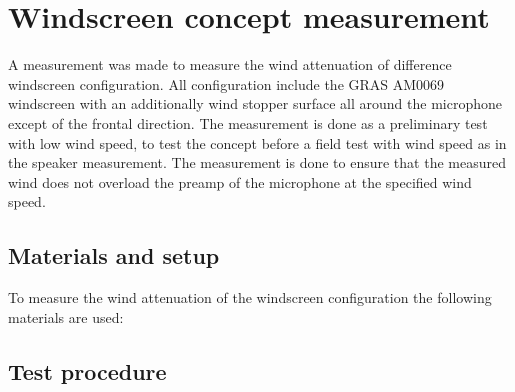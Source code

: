 \chapter{Windscreen concept measurement}
A measurement was made to measure the wind attenuation of difference windscreen configuration. All configuration include the GRAS AM0069 windscreen with an additionally wind stopper surface all around the microphone except of the frontal direction. The measurement is done as a preliminary test with low wind speed, to test the concept before a field test with wind speed as in the speaker measurement. The measurement is done to ensure that the measured wind does not overload the preamp of the microphone at the specified wind speed.  


\section*{Materials and setup}
To measure the wind attenuation of the windscreen configuration the following materials are used:

\startequipment
{}
\stopequipment
\startequipment
{}
\stopequipment



\section*{Test procedure}


